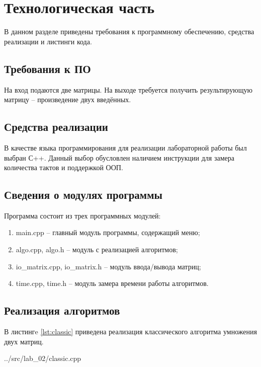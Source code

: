 \section{Технологическая часть}
В данном разделе приведены требования к программному обеспечению, средства реализации и листинги кода.

\subsection{Требования к ПО}
На вход подаются две матрицы.
На выходе требуется получить результирующую матрицу -- произведение двух введённых.

\subsection{Средства реализации}

В качестве языка программирования для реализации лабораторной работы был выбран С++.
Данный выбор обусловлен наличием инструкции \cite{microsoft_rdtsc} для замера количества тактов и поддержкой ООП.

\subsection{Сведения о модулях программы}
Программа состоит из трех программных модулей:
\begin{enumerate}[label={\arabic*)}]
	\item main.cpp -- главный модуль программы, содержащий меню;
	\item algo.cpp, algo.h -- модуль с реализацией алгоритмов;
	\item io\_matrix.cpp, io\_matrix.h -- модуль ввода/вывода матриц;
	\item time.cpp, time.h -- модуль замера времени работы алгоритмов.
\end{enumerate}

\newpage



\subsection{Реализация алгоритмов}

В листингe \ref{lst:classic} приведена реализация классического алгоритма умножения двух матриц.

\begin{lstinputlisting}[
	label={lst:classic},
	caption={Классический алгоритм},
	]{../src/lab_02/classic.cpp}
\end{lstinputlisting}

